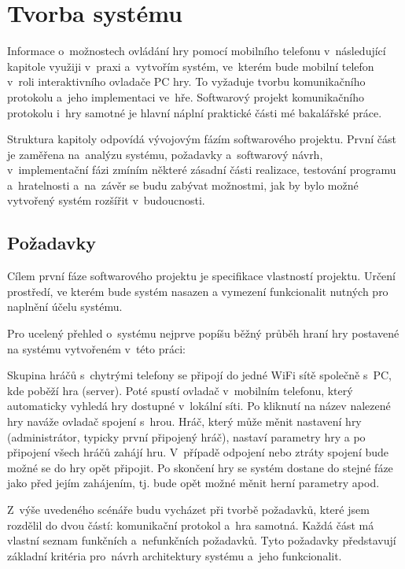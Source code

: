 \documentclass[thesis=B,czech,hidelinks]{FITthesis}[2012/06/26] %
\begin{document}
\chapter{Tvorba systému}
\label{chapter:implementation}

Informace o~možnostech ovládání hry pomocí mobilního telefonu v~následující kapitole využiji v~praxi a~vytvořím systém, ve~kterém bude mobilní telefon v~roli interaktivního ovladače PC hry. To vyžaduje tvorbu komunikačního protokolu a~jeho implementaci ve~hře. Softwarový projekt komunikačního protokolu i~hry samotné je hlavní náplní praktické části mé bakalářské práce.

Struktura kapitoly odpovídá vývojovým fázím softwarového projektu. \cite{si} První část je zaměřena na~analýzu systému, požadavky a~softwarový návrh, v~implementační fázi zmíním některé zásadní části realizace, testování programu a~hratelnosti a~na~závěr se budu zabývat možnostmi, jak by bylo možné vytvořený systém rozšířit v~budoucnosti.

\section{Požadavky}

Cílem první fáze softwarového projektu je specifikace vlastností projektu. Určení prostředí, ve kterém bude systém nasazen a vymezení funkcionalit nutných pro naplnění účelu systému.

Pro ucelený přehled o~systému nejprve popíšu běžný průběh hraní hry postavené na systému vytvořeném v~této práci:

Skupina hráčů s~chytrými telefony se připojí do jedné WiFi sítě společně s~PC, kde poběží hra (server). Poté spustí ovladač v~mobilním telefonu, který automaticky vyhledá hry dostupné v~lokální síti. Po kliknutí na název nalezené hry naváže ovladač spojení s~hrou. Hráč, který může měnit nastavení hry (administrátor, typicky první připojený hráč), nastaví parametry hry a po připojení všech hráčů zahájí hru. V~případě odpojení nebo ztráty spojení bude možné se do hry opět připojit. Po skončení hry se systém dostane do stejné fáze jako před jejím zahájením, tj. bude opět možné měnit herní parametry apod.

Z~výše uvedeného scénáře budu vycházet při tvorbě požadavků, které jsem rozdělil do dvou částí: komunikační protokol a~hra samotná. Každá část má vlastní seznam funkčních a~nefunkčních požadavků. Tyto požadavky představují základní kritéria pro~návrh architektury systému a~jeho funkcionalit.
\end{document}
